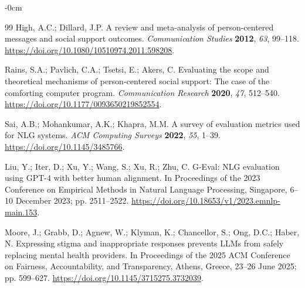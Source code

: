\documentclass[higheredu,article,submit,pdftex,moreauthors]{Definitions/mdpi}
\begin{document}
\begin{adjustwidth}{-\extralength}{0cm}
\begin{thebibliography}{99}
High, A.C.; Dillard, J.P. A review and meta-analysis of person-centered messages and social support outcomes. \textit{Communication Studies} \textbf{2012}, \textit{63}, 99--118. \href{https://doi.org/10.1080/10510974.2011.598208}{https://doi.org/10.1080/10510974.2011.598208}.

Rains, S.A.; Pavlich, C.A.; Tsetsi, E.; Akers, C. Evaluating the scope and theoretical mechanisms of person-centered social support: The case of the comforting computer program. \textit{Communication Research} \textbf{2020}, \textit{47}, 512--540. \href{https://doi.org/10.1177/0093650219852554}{https://doi.org/10.1177/0093650219852554}.

Sai, A.B.; Mohankumar, A.K.; Khapra, M.M. A survey of evaluation metrics used for NLG systems. \textit{ACM Computing Surveys} \textbf{2022}, \textit{55}, 1--39. \href{https://doi.org/10.1145/3485766}{https://doi.org/10.1145/3485766}.

Liu, Y.; Iter, D.; Xu, Y.; Wang, S.; Xu, R.; Zhu, C. G-Eval: NLG evaluation using GPT-4 with better human alignment. In Proceedings of the 2023 Conference on Empirical Methods in Natural Language Processing, Singapore, 6--10 December 2023; pp. 2511--2522. \href{https://doi.org/10.18653/v1/2023.emnlp-main.153}{https://doi.org/10.18653/v1/2023.emnlp-main.153}.

Moore, J.; Grabb, D.; Agnew, W.; Klyman, K.; Chancellor, S.; Ong, D.C.; Haber, N. Expressing stigma and inappropriate responses prevents LLMs from safely replacing mental health providers. In Proceedings of the 2025 ACM Conference on Fairness, Accountability, and Transparency, Athens, Greece, 23--26 June 2025; pp. 599--627. \href{https://doi.org/10.1145/3715275.3732039}{https://doi.org/10.1145/3715275.3732039}.

\end{thebibliography}

\PublishersNote{}
\end{adjustwidth}
\end{document}
